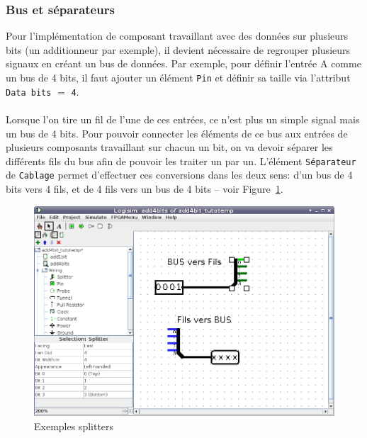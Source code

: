 \subsubsection{Bus et séparateurs}

Pour l'implémentation de composant travaillant avec des données sur plusieurs bits (un additionneur par exemple), 
il devient nécessaire de regrouper plusieurs signaux en créant un bus de données.
Par exemple, pour définir l'entrée A comme un bus de 4 bits, il
faut ajouter un élément \texttt{Pin} et définir sa taille via l'attribut \texttt{Data bits} $=$ \texttt{4}.

\paragraph{}
Lorsque l'on tire un fil de l'une de ces entrées, ce n'est plus un simple signal mais un bus de 4 bits. Pour
pouvoir connecter les éléments de ce bus aux entrées de plusieurs composants travaillant sur chacun un bit, 
on va devoir séparer les différents fils du bus afin de pouvoir les traiter un par un. L'élément \texttt{Séparateur} 
de \texttt{Cablage} permet d'effectuer ces conversions dans les deux sens: d'un bus de 4 bits vers 4 fils, 
et de 4 fils vers un bus de 4 bits -- voir Figure~\ref{fig_splitter}.

\begin{figure}[H]
\begin{center}
\includegraphics[width=500pt]{pictures/logisim_splitters.png}
\caption{\label{fig_splitter}Exemples splitters}
\end{center}
\end{figure}

